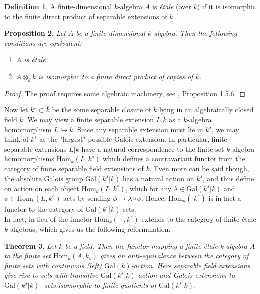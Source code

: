 \documentclass{article}
\newtheorem{theorem}{Theorem}[section]
\theoremstyle{definition}
\newtheorem{definition}[theorem]{Definition}
\theoremstyle{remark}
\theoremstyle{plain}
\newtheorem{proposition}[theorem]{Proposition}
\begin{document}
\begin{definition} 
	A finite-dimensional $k$-algebra $A$ is \textit{\'etale} (over $k$) if it is isomorphic to the finite direct product of separable extensions of $k$.
\end{definition}

\begin{proposition} 
	Let $A$ be a finite dimensional $k$-algebra.
	Then the following conditions are equivalent:
	\begin{enumerate}
		\item $A$ is \'etale
		\item $A \otimes_k \overline{k}$ is isomorphic to a finite direct product of copies of $\overline{k}$.
	\end{enumerate}
\end{proposition}
\begin{proof}
	The proof requires some algebraic machinery, see \cite{Szamuely}, Proposition 1.5.6.
\end{proof}

Now let $k^s \subset \overline{k}$ be the some separable closure of $k$ lying in an algebraically closed field $\overline{k}$.
We may view a finite separable extension $L|k$ as a $k$-algebra homomorphism $L \hookrightarrow \overline{k}$. Since any separable extension must lie in $k^s$, we may think of $k^s$ as the "largest" possible Galois extension.
In particular, finite separable extensions $L|k$ have a natural correspondence to the finite set $k$-algebra homomorphisms $\text{Hom}_k(L, k^s)$
 which defines a contravariant functor from the category of finite separable field extensions of $k$.
 Even more can be said though, the absolute Galois group $\text{Gal}(k^s|k)$ has a natural action on $k^s$, and thus define on action on each object $\text{Hom}_k(L, k^s)$, which for any $\lambda \in \text{Gal}(k^s|k)$ and $\phi \in \text{Hom}_k(L, k^s)$ acts by sending $\phi \to \lambda \circ \phi$.
 Hence, $\text{Hom}_k(_, k^s)$ is in fact a functor to the category of $\text{Gal}(k^s|k)$-sets.\\
\indent In fact, in lieu of  the functor $\text{Hom}_k(-,k^s)$ extends to the category of finite \'etale $k$-algebras, which gives us the following reformulation.

\begin{theorem}
	Let $k$ be a field. 
	Then the functor mapping a finite \'etale k-algebra $A$ to the finite set $\text{Hom}_k(A, k_s)$ gives an anti-equivalence between the category of finite sets with continuous (left) $\text{Gal}(k)$-action.
	Here separable field extensions give rise to sets with transitive $\text{Gal}(k^s|k)$-action and Galois extensions to $\text{Gal}(k^s|k)$ -sets isomorphic to finite quotients of $\text{Gal}(k^s|k)$.
\end{theorem}
\end{document}
